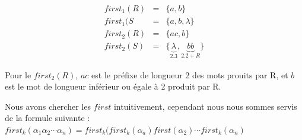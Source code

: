 \documentclass[12pt,a4paper,openany]{book}
\begin{document}
\begin{eqnarray*}
	first_1(R) &=&\{a,b\}\\
	first_1(S &=&  \{a,b,\lambda\}\\
	first_2(R) &=& \{ac,b\}\\
	first_2(S) &=& \{\underbrace{\lambda}_{2.3},\underbrace{bb}_{2.2 + R}\}
\end{eqnarray*}
\begin{remarque}
	Pour le $first_2(R)$, $ac$ est le préfixe de longueur 2 des mots prouits par R, et $b$ est le mot de longueur inférieur ou égale à 2 produit par
	R.
\end{remarque}

Nous avons chercher les $first$ intuitivement, cependant nous nous sommes servis de la formule suivante : $first_k(\alpha_1 \alpha_2 \cdots \alpha_n) =
first_k(first_k(\alpha_a)first(\alpha_2) \cdots first_k(\alpha_n)$
\end{document}
